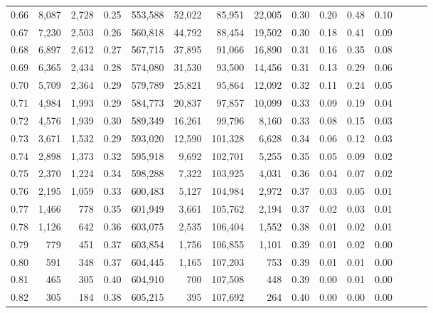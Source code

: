 \begin{tabular}{rrrrrrrrrrrrrrr}
0.66 &   8,087 &  2,728 &  0.25 &  553,588 &   52,022 &   85,951 &   22,005 &  0.30 &  0.20 &  0.48 &      0.10 \\
0.67 &   7,230 &  2,503 &  0.26 &  560,818 &   44,792 &   88,454 &   19,502 &  0.30 &  0.18 &  0.41 &      0.09 \\
0.68 &   6,897 &  2,612 &  0.27 &  567,715 &   37,895 &   91,066 &   16,890 &  0.31 &  0.16 &  0.35 &      0.08 \\
0.69 &   6,365 &  2,434 &  0.28 &  574,080 &   31,530 &   93,500 &   14,456 &  0.31 &  0.13 &  0.29 &      0.06 \\
0.70 &   5,709 &  2,364 &  0.29 &  579,789 &   25,821 &   95,864 &   12,092 &  0.32 &  0.11 &  0.24 &      0.05 \\
0.71 &   4,984 &  1,993 &  0.29 &  584,773 &   20,837 &   97,857 &   10,099 &  0.33 &  0.09 &  0.19 &      0.04 \\
0.72 &   4,576 &  1,939 &  0.30 &  589,349 &   16,261 &   99,796 &    8,160 &  0.33 &  0.08 &  0.15 &      0.03 \\
0.73 &   3,671 &  1,532 &  0.29 &  593,020 &   12,590 &  101,328 &    6,628 &  0.34 &  0.06 &  0.12 &      0.03 \\
0.74 &   2,898 &  1,373 &  0.32 &  595,918 &    9,692 &  102,701 &    5,255 &  0.35 &  0.05 &  0.09 &      0.02 \\
0.75 &   2,370 &  1,224 &  0.34 &  598,288 &    7,322 &  103,925 &    4,031 &  0.36 &  0.04 &  0.07 &      0.02 \\
0.76 &   2,195 &  1,059 &  0.33 &  600,483 &    5,127 &  104,984 &    2,972 &  0.37 &  0.03 &  0.05 &      0.01 \\
0.77 &   1,466 &    778 &  0.35 &  601,949 &    3,661 &  105,762 &    2,194 &  0.37 &  0.02 &  0.03 &      0.01 \\
0.78 &   1,126 &    642 &  0.36 &  603,075 &    2,535 &  106,404 &    1,552 &  0.38 &  0.01 &  0.02 &      0.01 \\
0.79 &     779 &    451 &  0.37 &  603,854 &    1,756 &  106,855 &    1,101 &  0.39 &  0.01 &  0.02 &      0.00 \\
0.80 &     591 &    348 &  0.37 &  604,445 &    1,165 &  107,203 &      753 &  0.39 &  0.01 &  0.01 &      0.00 \\
0.81 &     465 &    305 &  0.40 &  604,910 &      700 &  107,508 &      448 &  0.39 &  0.00 &  0.01 &      0.00 \\
0.82 &     305 &    184 &  0.38 &  605,215 &      395 &  107,692 &      264 &  0.40 &  0.00 &  0.00 &      0.00 \\

\end{tabular}
